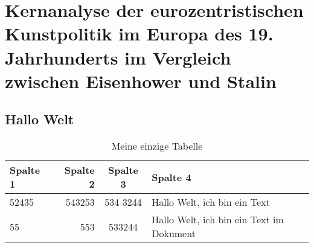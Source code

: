 \chapter[Kernanalyse der eurozentristischen Kunstpolitik]{Kernanalyse der eurozentristischen Kunstpolitik im Europa des 19. Jahrhunderts im Vergleich zwischen Eisenhower und Stalin}

\section{Hallo Welt}

\blindtext[3]


\begin{table}[b]
\begin{center}
\caption{Meine einzige Tabelle}\label{tab:tabelle}
\begin{tabular}{lrcp{6cm}} \toprule 
Spalte 1 & Spalte 2 & Spalte 3 & Spalte 4 \\ \midrule
52435 & 543253 & 534 3244 & Hallo Welt, ich bin ein Text \\
55 & 553 & 533244 & Hallo Welt, ich bin ein Text im Dokument\\ \bottomrule
\end{tabular}
\end{center}
\end{table}

\blindtext[3]

